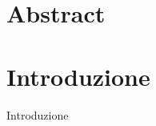 \documentclass[12pt,oneside]{report}
\begin{document}
 
	                
	\begin{titlepage}
		
	\end{titlepage} 
    
    
	\chapter*{Abstract}
	
    \tableofcontents{}
    \listoftables
    \listoflistings
    \newpage
    \chapter{Introduzione}
    {Introduzione}
    \newpage
     
    
\end{document}
